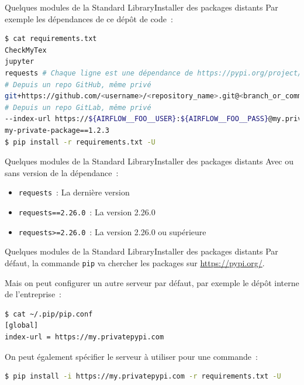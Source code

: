\documentclass{beamer}
\begin{document}
    \begin{frame}[fragile]{Quelques modules de la Standard Library}{Installer des packages distants}
        Par exemple les dépendances de ce dépôt de code~:
        \begin{lstlisting}[language=Bash]
$ cat requirements.txt
CheckMyTex
jupyter
requests # Chaque ligne est une dépendance de https://pypi.org/project/requests/
# Depuis un repo GitHub, même privé
git+https://github.com/<username>/<repository_name>.git@<branch_or_commit(optional)>#egg=<package_name>
# Depuis un repo GitLab, même privé
--index-url https://${AIRFLOW__FOO__USER}:${AIRFLOW__FOO__PASS}@my.privatepypi.com
my-private-package==1.2.3
$ pip install -r requirements.txt -U
        \end{lstlisting}
    \end{frame}

    \begin{frame}[fragile]{Quelques modules de la Standard Library}{Installer des packages distants}
        Avec ou sans version de la dépendance~:
        \begin{itemize}
            \item \lstinline{requests}~: La dernière version
            \item \lstinline{requests==2.26.0}~: La version 2.26.0
            \item \lstinline{requests>=2.26.0}~: La version 2.26.0 ou supérieure
        \end{itemize}
    \end{frame}

    \begin{frame}[fragile]{Quelques modules de la Standard Library}{Installer des packages distants}
        Par défaut, la commande \lstinline{pip} va chercher les packages sur \url{https://pypi.org/}.

        Mais on peut configurer un autre serveur par défaut, par exemple le dépôt interne de l'entreprise~:
        \begin{lstlisting}[language=Bash]
$ cat ~/.pip/pip.conf
[global]
index-url = https://my.privatepypi.com
        \end{lstlisting}
        \bigbreak
        On peut également spécifier le serveur à utiliser pour une commande~:
        \begin{lstlisting}[language=Bash]
$ pip install -i https://my.privatepypi.com -r requirements.txt -U
        \end{lstlisting}
    \end{frame}
\end{document}
